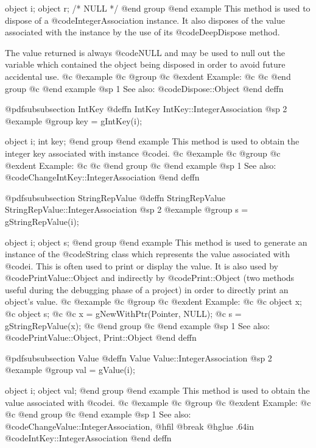 object  i;
object  r;     /*  NULL  */
@end group
@end example
This method is used to dispose of a @code{IntegerAssociation} instance.
It also disposes of the value associated with the instance by the
use of its @code{DeepDispose} method.

The value returned is always @code{NULL} and may be used to null out
the variable which contained the object being disposed in order to
avoid future accidental use.
@c @example
@c @group
@c @exdent Example:
@c 
@c @end group
@c @end example
@sp 1
See also:  @code{Dispose::Object}
@end deffn


















@pdfsubsubsection {IntKey}
@deffn {IntKey} IntKey::IntegerAssociation
@sp 2
@example
@group
key = gIntKey(i);

object  i;
int     key;
@end group
@end example
This method is used to obtain the integer key associated with instance @code{i}.
@c @example
@c @group
@c @exdent Example:
@c 
@c @end group
@c @end example
@sp 1
See also:  @code{ChangeIntKey::IntegerAssociation}
@end deffn









@pdfsubsubsection {StringRepValue}
@deffn {StringRepValue} StringRepValue::IntegerAssociation
@sp 2
@example
@group
s = gStringRepValue(i);

object  i;
object  s;
@end group
@end example
This method is used to generate an instance of the @code{String} class
which represents the value associated with @code{i}.  This is often
used to print or display the value.  It is also used by
@code{PrintValue::Object} and indirectly by @code{Print::Object}
(two methods useful during the debugging phase of a project)
in order to directly print an object's value.
@c @example
@c @group
@c @exdent Example:
@c 
@c object  x;
@c object  s;
@c 
@c x = gNewWithPtr(Pointer, NULL);
@c s = gStringRepValue(x);
@c @end group
@c @end example
@sp 1
See also:  @code{PrintValue::Object, Print::Object}
@end deffn










@pdfsubsubsection {Value}
@deffn {Value} Value::IntegerAssociation
@sp 2
@example
@group
val = gValue(i);

object  i;
object  val;
@end group
@end example
This method is used to obtain the value associated with
@code{i}.
@c @example
@c @group
@c @exdent Example:
@c 
@c @end group
@c @end example
@sp 1
See also:  @code{ChangeValue::IntegerAssociation,}
@hfil @break @hglue .64in      @code{IntKey::IntegerAssociation}
@end deffn





